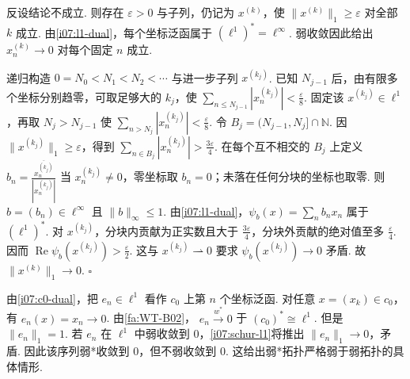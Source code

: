 \begin{FAProof}
反设结论不成立. 则存在 \(\displaystyle \varepsilon>0\) 与子列，仍记为 \(\displaystyle x^{(k)}\)，使 \(\displaystyle \|x^{(k)}\|_1\geqslant\varepsilon\) 对全部 \(\displaystyle k\) 成立. 由\autoref{i07:l1-dual}，每个坐标泛函属于 \(\displaystyle (\ell^1)^*=\ell^\infty\). 弱收敛因此给出 \(\displaystyle x_n^{(k)}\to0\) 对每个固定 \(\displaystyle n\) 成立.

递归构造 \(\displaystyle 0=N_0<N_1<N_2<\cdots\) 与进一步子列 \(\displaystyle x^{(k_j)}\). 已知 \(\displaystyle N_{j-1}\) 后，由有限多个坐标分别趋零，可取足够大的 \(\displaystyle k_j\)，使 \(\displaystyle \sum_{n\leqslant N_{j-1}}|x_n^{(k_j)}|<\frac{\varepsilon}{8}\).
固定该 \(\displaystyle x^{(k_j)}\in\ell^1\)，再取 \(\displaystyle N_j>N_{j-1}\) 使 \(\displaystyle \sum_{n>N_j}|x_n^{(k_j)}|<\frac{\varepsilon}{8}\).
令 \(\displaystyle B_j=(N_{j-1},N_j]\cap\mathbb N\). 因 \(\displaystyle \|x^{(k_j)}\|_1\geqslant\varepsilon\)，得到 \(\displaystyle \sum_{n\in B_j}|x_n^{(k_j)}|>\frac{3\varepsilon}{4}\).
在每个互不相交的 \(\displaystyle B_j\) 上定义 \(\displaystyle b_n=\frac{\overline{x_n^{(k_j)}}}{|x_n^{(k_j)}|}\) 当 \(\displaystyle x_n^{(k_j)}\neq0\)，零坐标取 \(\displaystyle b_n=0\)；未落在任何分块的坐标也取零. 则 \(\displaystyle b=(b_n)\in\ell^\infty\) 且 \(\displaystyle \|b\|_\infty\leqslant1\). 由\autoref{i07:l1-dual}，\(\displaystyle \psi_b(x)=\sum_nb_nx_n\) 属于 \(\displaystyle (\ell^1)^*\). 对 \(\displaystyle x^{(k_j)}\)，分块内贡献为正实数且大于 \(\displaystyle \frac{3\varepsilon}{4}\)，分块外贡献的绝对值至多 \(\displaystyle \frac{\varepsilon}{4}\). 因而 \(\displaystyle \operatorname{Re}\psi_b(x^{(k_j)})>\frac{\varepsilon}{2}\).
这与 \(\displaystyle x^{(k_j)}\rightharpoonup0\) 要求 \(\displaystyle \psi_b(x^{(k_j)})\to0\) 矛盾. 故 \(\displaystyle \|x^{(k)}\|_1\to0\).
\hfill\(\square\)
\end{FAProof}

\begin{FACounterexample}[弱*收敛可不弱收敛]\label{i07:ce-wstar-weak}
由\autoref{i07:c0-dual}，把 \(\displaystyle e_n\in\ell^1\) 看作 \(\displaystyle c_0\) 上第 \(\displaystyle n\) 个坐标泛函. 对任意 \(\displaystyle x=(x_k)\in c_0\)，有 \(\displaystyle e_n(x)=x_n\to0\). 由\autoref{fa:WT-B02}， \(\displaystyle e_n\overset{w^*}{\longrightarrow}0\)
于 \(\displaystyle (c_0)^*\cong\ell^1\). 但是 \(\displaystyle \|e_n\|_1=1\). 若 \(\displaystyle e_n\) 在 \(\displaystyle \ell^1\) 中弱收敛到 \(\displaystyle0\)，\autoref{i07:schur-l1}将推出 \(\displaystyle \|e_n\|_1\to0\)，矛盾. 因此该序列弱*收敛到 \(\displaystyle0\)，但不弱收敛到 \(\displaystyle0\). 这给出弱*拓扑严格弱于弱拓扑的具体情形.
\end{FACounterexample}

